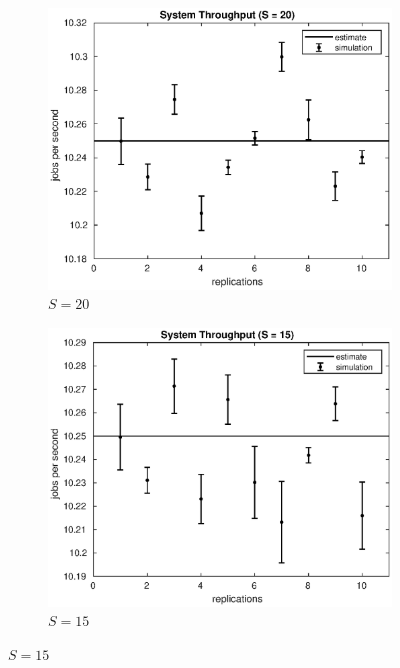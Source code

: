 
\begin{figure}[!h]
\centering
%
\begin{subfigure}[t]{0.49\textwidth}
\includegraphics[width=\textwidth]{figures/simul/20_500K_x}
\caption{$S = 20$}
\label{20_x}
\end{subfigure}
%
\begin{subfigure}[t]{0.49\textwidth}
\includegraphics[width=\textwidth]{figures/simul/15_500K_x}
\caption{$S = 15$}
\label{15_x}
\end{subfigure}

\end{figure}
